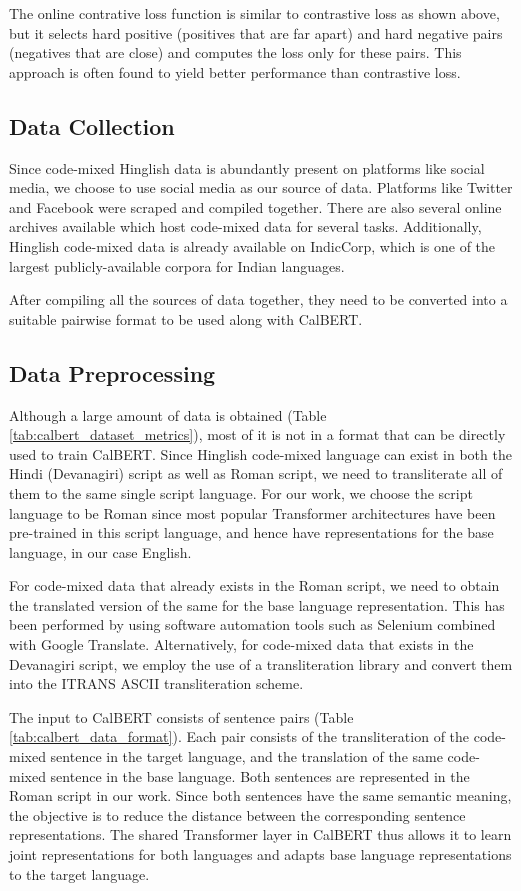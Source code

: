 \documentclass[conference]{IEEEtran}
\begin{document}
The online contrative loss function is similar to contrastive loss as shown above, but it selects hard positive (positives that are far apart) and hard negative pairs (negatives that are close) and computes the loss only for these pairs. This approach is often found to yield better performance than contrastive loss.



\subsection{Data Collection}
Since code-mixed Hinglish data is abundantly present on platforms like social media, we choose to use social media as our source of data. Platforms like Twitter and Facebook were scraped and compiled together. There are also several online archives available which host code-mixed data for several tasks. Additionally, Hinglish code-mixed data is already available on IndicCorp, which is one of the largest publicly-available corpora for Indian languages. 

After compiling all the sources of data together, they need to be converted into a suitable pairwise format to be used along with CalBERT. 
\subsection{Data Preprocessing}

Although a large amount of data is obtained (Table \ref{tab:calbert_dataset_metrics}), most of it is not in a format that can be directly used to train CalBERT. Since Hinglish code-mixed language can exist in both the Hindi (Devanagiri) script as well as Roman script, we need to transliterate all of them to the same single script language. For our work, we choose the script language to be Roman since most popular Transformer architectures have been pre-trained in this script language, and hence have representations for the base language, in our case English.

For code-mixed data that already exists in the Roman script, we need to obtain the translated version of the same for the base language representation. This has been performed by using software automation tools such as Selenium combined with Google Translate. Alternatively, for code-mixed data that exists in the Devanagiri script, we employ the use of a transliteration library and convert them into the ITRANS ASCII transliteration scheme\cite{b15}.

The input to CalBERT consists of sentence pairs (Table \ref{tab:calbert_data_format}). Each pair consists of the transliteration of the code-mixed sentence in the target language, and the translation of the same code-mixed sentence in the base language. Both sentences are represented in the Roman script in our work. Since both sentences have the same semantic meaning, the objective is to reduce the distance between the corresponding sentence representations. The shared Transformer layer in CalBERT thus allows it to learn joint representations for both languages and adapts base language representations to the target language.
\end{document}
